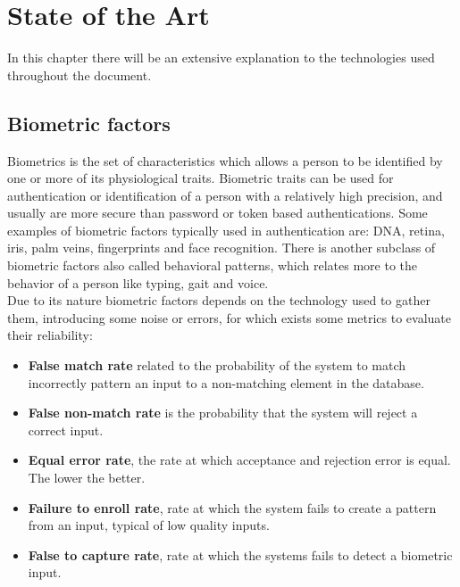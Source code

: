 \chapter{State of the Art}

In this chapter there will be an extensive explanation to the technologies used
throughout the document.



\section{Biometric factors}
Biometrics is the set of characteristics which allows a person to be identified
by one or more of its physiological traits. Biometric traits can be used for
authentication or identification of a person with a relatively high precision, and
usually are more secure than password or token based authentications. Some examples
of biometric factors typically used in authentication are: DNA, retina, iris, palm
veins, fingerprints and face recognition. There is another subclass of biometric
factors also called behavioral patterns, which relates more to the behavior of a person
like typing, gait and voice.\\
Due to its nature biometric factors depends on the technology used to gather them,
introducing some noise or errors, for which exists some metrics to evaluate their
reliability:

\begin{itemize}
    \item \textbf{False match rate} related to the probability of the system to
    match incorrectly pattern an input to a non-matching element in the database.
    \item \textbf{False non-match rate} is the probability that the system will reject
    a correct input.
    \item \textbf{Equal error rate}, the rate at which acceptance and rejection error is
    equal. The lower the better.
    \item \textbf{Failure to enroll rate}, rate at which the system fails to create
    a pattern from an input, typical of low quality inputs.
    \item \textbf{False to capture rate}, rate at which the systems fails to detect
    a biometric input.
\end{itemize}
